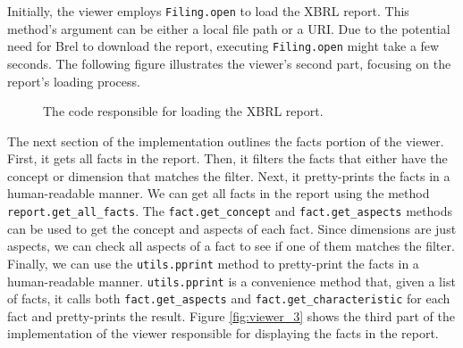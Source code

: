 Initially, the viewer employs \texttt{Filing.open} to load the XBRL report.
This method's argument can be either a local file path or a URI.
Due to the potential need for Brel to download the report, executing \texttt{Filing.open} might take a few seconds.
The following figure illustrates the viewer's second part, focusing on the report's loading process.

\begin{figure}[H]
    \centering
    
    \label{fig:viewer_2}
    \caption{The code responsible for loading the XBRL report.}
\end{figure}

The next section of the implementation outlines the facts portion of the viewer.
First, it gets all facts in the report.
Then, it filters the facts that either have the concept or dimension that matches the filter.
Next, it pretty-prints the facts in a human-readable manner.
We can get all facts in the report using the method \texttt{report.get\_all\_facts}.
The \texttt{fact.get\_concept} and \texttt{fact.get\_aspects} methods can be used to get the concept and aspects of each fact.
Since dimensions are just aspects, we can check all aspects of a fact to see if one of them matches the filter.
Finally, we can use the \texttt{utils.pprint} method to pretty-print the facts in a human-readable manner.
\texttt{utils.pprint} is a convenience method that, given a list of facts, it calls both \texttt{fact.get\_aspects} and \texttt{fact.get\_characteristic} for each fact and pretty-prints the result.
Figure \ref{fig:viewer_3} shows the third part of the implementation of the viewer responsible for displaying the facts in the report.

